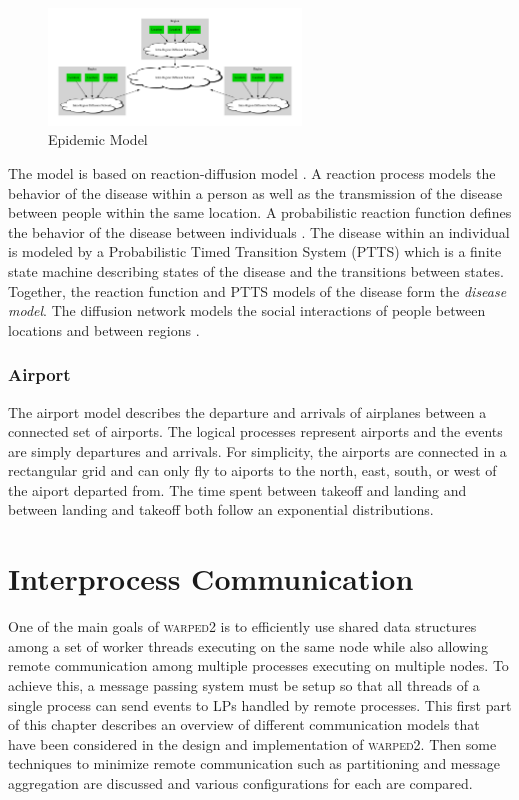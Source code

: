 \documentclass[11pt]{book}
\begin{document}
\begin{figure}
    \centering
    \includegraphics[width=0.6\textwidth,quiet]{figs/graphviz/epidemic.pdf}
    \caption{Epidemic Model}\label{epidemic_model}
\end{figure}

The model is based on reaction-diffusion model \cite{perumalla-12}.  A reaction process models the
behavior of the disease within a person as well as the transmission of the disease between people
within the same location.  A probabilistic reaction function defines the behavior of the disease
between individuals \cite{barrett-08}.  The disease within an individual is modeled by a
Probabilistic Timed Transition System (PTTS) \cite{barrett-08} which is a finite state machine
describing states of the disease and the transitions between states.  Together, the reaction
function and PTTS models of the disease form the \emph{disease model}.  The diffusion network models
the social interactions of people between locations and between regions \cite{barrett-08}.

\subsection{Airport}

The airport model describes the departure and arrivals of airplanes between a connected set of
airports.  The logical processes represent airports and the events are simply departures and
arrivals.  For simplicity, the airports are connected in a rectangular grid and can only fly to
aiports to the north, east, south, or west of the aiport departed from.  The time spent between
takeoff and landing and between landing and takeoff both follow an exponential distributions.



\chapter[Communication]{Interprocess Communication} \label{partitioning_communication}

One of the main goals of \textsc{warped2} is to efficiently use shared data structures among a set
of worker threads executing on the same node while also allowing remote communication among multiple
processes executing on multiple nodes.  To achieve this, a message passing system must be setup so
that all threads of a single process can send events to LPs handled by remote processes.  This first
part of this chapter describes an overview of different communication models that have been
considered in the design and implementation of \textsc{warped2}.  Then some techniques to minimize
remote communication such as partitioning and message aggregation are discussed and various
configurations for each are compared.
\end{document}

